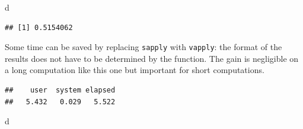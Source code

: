 \documentclass[
  12pt,
  american,
  a4paper,
  extrafontsizes,onecolumn,openright
  ]{memoir}
\newenvironment{Shaded}{\begin{snugshade}}{\end{snugshade}}
\newcommand{\ControlFlowTok}[1]{\textcolor[rgb]{0.13,0.29,0.53}{\textbf{#1}}}
\newcommand{\DecValTok}[1]{\textcolor[rgb]{0.00,0.00,0.81}{#1}}
\newcommand{\FunctionTok}[1]{\textcolor[rgb]{0.00,0.00,0.00}{#1}}
\newcommand{\NormalTok}[1]{#1}
\newcommand{\OtherTok}[1]{\textcolor[rgb]{0.56,0.35,0.01}{#1}}
\newcommand{\SpecialCharTok}[1]{\textcolor[rgb]{0.00,0.00,0.00}{#1}}
\begin{document}
\begin{Shaded}
\begin{Highlighting}[]
\NormalTok{d}
\end{Highlighting}
\end{Shaded}

\begin{verbatim}
## [1] 0.5154062
\end{verbatim}

\normalsize

Some time can be saved by replacing \texttt{sapply} with \texttt{vapply}: the format of the results does not have to be determined by the function.
The gain is negligible on a long computation like this one but important for short computations.

\scriptsize

\begin{Shaded}
\end{Shaded}

\begin{verbatim}
##    user  system elapsed 
##   5.432   0.029   5.522
\end{verbatim}

\begin{Shaded}
\begin{Highlighting}[]
\NormalTok{d}
\end{Highlighting}
\end{Shaded}
\end{document}
